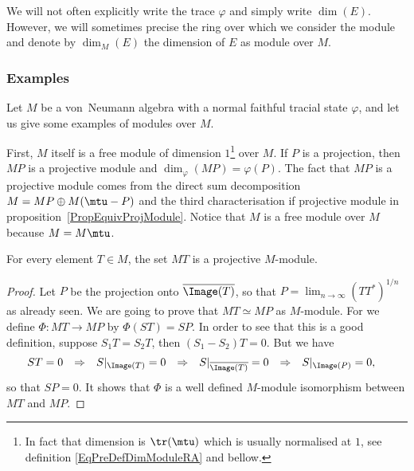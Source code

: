 We will not often explicitly write the trace $\varphi$ and simply write $\dim(E)$. However, we will sometimes precise the ring over which we consider the module and denote by $\dim_M(E)$ the dimension of $E$ as module over $M$.

					\subsubsection{Examples}		\label{subsubsecExemDimMMMod}

Let $M$ be a von~Neumann algebra with a normal faithful tracial state $\varphi$, and let us give some examples of modules over $M$.

First, $M$ itself is a free module of dimension $1$\footnote{In fact that dimension is $\tr(\mtu)$ which is usually normalised at $1$, see definition \eqref{EqPreDefDimModuleRA} and bellow.} over $M$. If $P$ is a projection, then $MP$ is a projective module\label{PgMPprojModule} and $\dim_{\varphi}(MP)=\varphi(P)$. The fact that $MP$ is a projective module comes from the direct sum decomposition $M=MP\oplus M(\mtu-P)$ and the third characterisation if projective module in proposition~\ref{PropEquivProjModule}. Notice that $M$ is a free module over $M$ because $M=M\mtu$.

\begin{proposition}		\label{PropMTprojpourtoutT}
For every element $T\in M$, the set $MT$ is a projective $M$-module.
\end{proposition}

\begin{proof}
Let $P$ be the projection onto $\overline{ \Image(T) }$, so that $P=\lim_{n\to\infty}(TT^*)^{1/n}$ as already seen. We are going to prove that $MT\simeq MP$ as $M$-module. For we define $\Phi\colon MT\to MP$ by $\Phi(ST)=SP$. In order to see that this is a good definition, suppose $S_1T=S_2T$, then $(S_1-S_2)T=0$. But we have
\begin{align}
	ST&=0&\Rightarrow &&S|_{\Image(T)}&=0&\Rightarrow &&S|_{\overline{ \Image(T) }}&=0&\Rightarrow	&&S|_{\Image(P)}&=0,
\end{align}
so that $SP=0$. It shows that $\Phi$ is a well defined $M$-module isomorphism between $MT$ and $MP$.
\end{proof}

